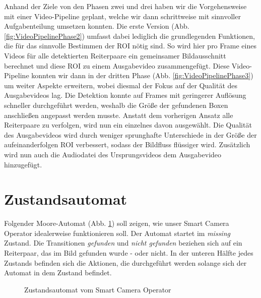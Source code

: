 Anhand der Ziele von den Phasen zwei und drei haben wir die Vorgehensweise mit einer Video-Pipeline geplant, welche wir dann schrittweise mit sinnvoller Aufgabenteilung umsetzen konnten. Die erste Version (Abb. \ref{fig:VideoPipelinePhase2}) umfasst dabei lediglich die grundlegenden Funktionen, die für das sinnvolle Bestimmen der ROI nötig sind. So wird hier pro Frame eines Videos für alle detektierten Reiterpaare ein gemeinsamer Bildausschnitt berechnet und diese ROI zu einem Ausgabevideo zusammengefügt.
Diese Video-Pipeline konnten wir dann in der dritten Phase (Abb. \ref{fig:VideoPipelinePhase3}) um weiter Aspekte erweitern, wobei diesmal der Fokus auf der Qualität des Ausgabevideos lag. Die Detektion konnte auf Frames mit geringerer Auflösung schneller durchgeführt werden, weshalb die Größe der gefundenen Boxen anschließen angepasst werden musste. Anstatt dem vorherigen Ansatz alle Reiterpaare zu verfolgen, wird nun ein einzelnes davon ausgewählt. Die Qualität des Ausgabevideos wird durch weniger sprunghafte Unterschiede in der Größe der aufeinanderfolgen ROI verbessert, sodass der Bildfluss flüssiger wird. Zusätzlich wird nun auch die Audiodatei des Ursprungsvideos dem Ausgabevideo hinzugefügt.


\section{Zustandsautomat}

Folgender Moore-Automat (Abb. \ref{fig:MoorAutomat}) soll zeigen, wie unser Smart Camera Operator idealerweise funktionieren soll.
Der Automat startet im \emph{missing} Zustand.
Die Transitionen \emph{gefunden} und \emph{nicht gefunden} beziehen sich auf ein Reiterpaar, das im Bild gefunden wurde - oder nicht.
In der unteren Hälfte jedes Zustands befinden sich die Aktionen, die durchgeführt werden solange sich der Automat in dem Zustand befindet.

\begin{figure}[h]
\centering
{}
\caption{Zustandsautomat vom Smart Camera Operator}
\label{fig:MoorAutomat}
\end{figure}
